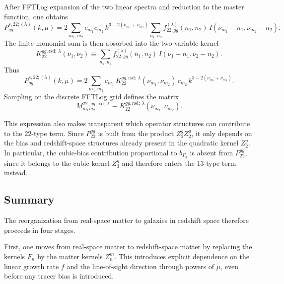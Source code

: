 \documentclass[a4paper,11pt]{article}
\newcommand{\<}{\langle}
\renewcommand{\>}{\rangle}
\begin{document}
After FFTLog expansion of the two linear spectra and reduction to the master function, one obtains
\begin{equation}
P_{gg}^{s,22;(\lambda)}(k,\mu)
=
2\sum_{m_1,m_2} c_{m_1}c_{m_2}\,
k^{3-2(\nu_{m_1}+\nu_{m_2})}
\sum_{n_1,n_2}
f_{22,gg}^{(\lambda)}(n_1,n_2)\,
I(\nu_{m_1}-n_1,\nu_{m_2}-n_2).
\label{eq:P22_gg_after_master}
\end{equation}
The finite monomial sum is then absorbed into the two-variable kernel
\begin{equation}
K_{22}^{gg,\mathrm{rsd};\,\lambda}(\nu_1,\nu_2)
\equiv
\sum_{n_1,n_2}
f_{22,gg}^{(\lambda)}(n_1,n_2)\,
I(\nu_1-n_1,\nu_2-n_2).
\label{eq:K22_gg_lambda}
\end{equation}
Thus
\begin{equation}
P_{gg}^{s,22;(\lambda)}(k,\mu)
=
2\sum_{m_1,m_2}
c_{m_1}\,
K_{22}^{gg,\mathrm{rsd};\,\lambda}(\nu_{m_1},\nu_{m_2})\,
c_{m_2}\,
k^{3-2(\nu_{m_1}+\nu_{m_2})}.
\label{eq:P22_gg_kernel_form}
\end{equation}
Sampling on the discrete FFTLog grid defines the matrix
\begin{equation}
M_{m_1m_2}^{22,\,gg,\mathrm{rsd};\,\lambda}
\equiv
K_{22}^{gg,\mathrm{rsd};\,\lambda}(\nu_{m_1},\nu_{m_2}).
\end{equation}

This expression also makes transparent which operator structures can contribute to the \(22\)-type term. Since \(P_{22}^{gg}\) is built from the product \(Z_2^g Z_2^g\), it only depends on the bias and redshift-space structures already present in the quadratic kernel \(Z_2^g\). In particular, the cubic-bias contribution proportional to \(b_{\Gamma_3}\) is absent from \(P_{22}^{gg}\), since it belongs to the cubic kernel \(Z_3^g\) and therefore enters the \(13\)-type term instead.

\subsection{Summary}

The reorganization from real-space matter to galaxies in redshift space therefore proceeds in four stages.

First, one moves from real-space matter to redshift-space matter by replacing the kernels \(F_n\) by the matter kernels \(Z_n^m\). This introduces explicit dependence on the linear growth rate \(f\) and the line-of-sight direction through powers of \(\mu\), even before any tracer bias is introduced.
\end{document}
